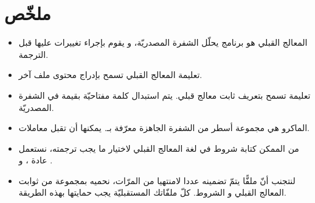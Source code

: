 \section*{ملخّص}
\begin{itemize}
  \item المعالج القبلي هو برنامج يحلّل الشفرة المصدريّة، و يقوم بإجراء تغييرات عليها قبل الترجمة.
  \item تعليمة المعالج القبلي
تسمح بإدراج محتوى ملف آخر.
  \item تعليمة
تسمح بتعريف ثابت معالج قبلي. يتم استبدال كلمة مفتاحيّة بقيمة في الشفرة المصدريّة.
  \item الماكرو هي مجموعة أسطر من الشفرة الجاهزة معرّفة بـ.
يمكنها أن تقبل معاملات.
  \item من الممكن كتابة شروط في لغة المعالج القبلي لاختيار ما يجب ترجمته، نستعمل عادة
،
و
.
  \item لنتجنب أنّ ملفًّا
يتمّ تضمينه عددا لامنتهيا من المرّات، نحميه بمجموعة من ثوابت المعالج القبلي و الشروط. كلّ ملفّاتك
المستقبليّة يجب حمايتها بهذه الطريقة.
\end{itemize}
